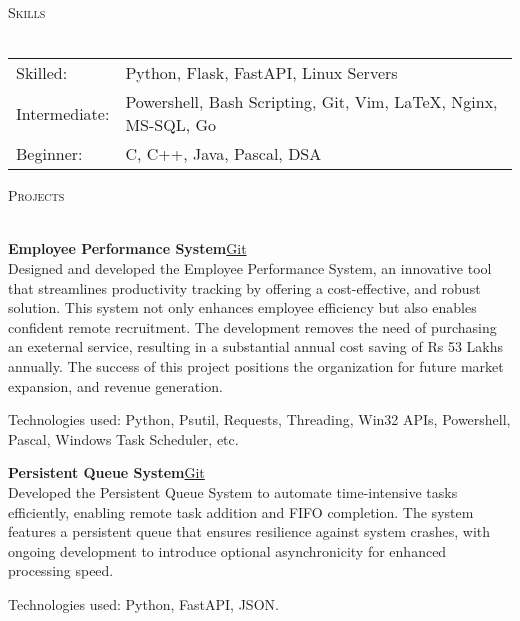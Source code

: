 \documentclass[a4paper]{article}
\newcommand{\lineunder} {
\vspace*{-8pt} \\
\hspace*{-18pt} \hrulefill \\
}
\newcommand{\header} [1] {
{\hspace*{-18pt}\vspace*{6pt} \textsc{#1}}
\vspace*{-6pt} \lineunder
}
\begin{document}

\header{Skills}
\vspace{1mm}

\begin{tabular}{V{5cm} @{\hskip 0.6cm} V{12cm}}
Skilled: & Python, Flask, FastAPI, Linux Servers \\
Intermediate: & Powershell, Bash Scripting, Git, Vim, \LaTeX, Nginx, MS-SQL, Go \\
Beginner: & C, C++, Java, Pascal, DSA \\
\end{tabular}

\vspace{4mm}


\header{Projects}
\vspace{1mm}

{\textbf{Employee Performance System}}\hfill \href{https://github.com/swarnimcodes/employee-performance}{Git}\\
Designed and developed the Employee Performance System, an innovative tool that 
streamlines productivity tracking by offering a cost-effective, and robust solution. 
This system not only enhances employee efficiency but also enables confident 
remote recruitment. The development removes the need of purchasing an 
exeternal service, resulting in a substantial annual cost saving of Rs 53 Lakhs annually. 
The success of this project positions the organization for future market expansion,
and revenue generation.

Technologies used: Python, Psutil, Requests, Threading, Win32 APIs, Powershell, Pascal, Windows Task Scheduler, etc.\\
\vspace*{2mm}

{\textbf{Persistent Queue System}}\hfill \href{https://github.com/swarnimcodes/kafkaesqueue}{Git}\\
Developed the Persistent Queue System to automate time-intensive tasks efficiently, 
enabling remote task addition and FIFO completion. The system features a persistent 
queue that ensures resilience against system crashes, with ongoing development to 
introduce optional asynchronicity for enhanced processing speed. 

Technologies used: Python, FastAPI, JSON.\\
\vspace*{2mm}
\end{document}
